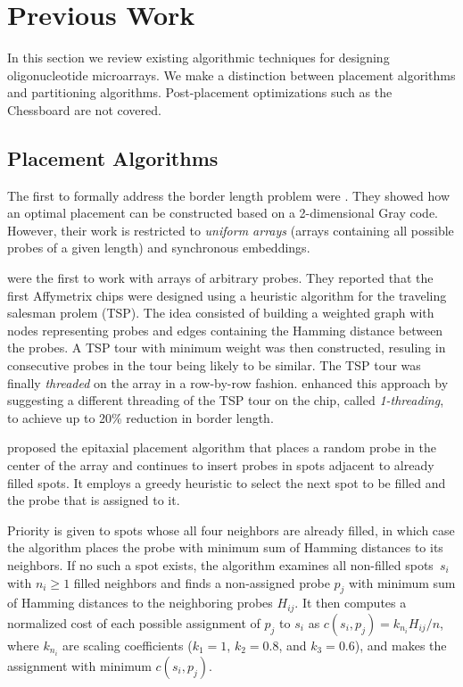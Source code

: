 \documentclass{bioinfo}
\begin{document}
\section{Previous Work}

In this section we review existing algorithmic techniques for designing oligonucleotide microarrays. We make a distinction between placement algorithms and partitioning algorithms. Post-placement optimizations such as the Chessboard \citep{KAHNG02} are not covered.

\subsection{Placement Algorithms}
\label{sec:placement_alg}

The first to formally address the border length problem were \citealp{FELDMAN93}. They showed how an optimal placement can be constructed based on a 2-dimensional Gray code. However, their work is restricted to \emph{uniform arrays} (arrays containing all possible probes of a given length) and synchronous embeddings.

\citealp{HANNENHALLI02} were the first to work with arrays of arbitrary probes. They reported that the first Affymetrix chips were designed using a heuristic algorithm for the traveling salesman prolem (TSP). The idea consisted of building a weighted graph with nodes representing probes and edges containing the Hamming distance between the probes. A TSP tour with minimum weight was then constructed, resuling in consecutive probes in the tour being likely to be similar. The TSP tour was finally \emph{threaded} on the array in a row-by-row fashion. \citealp{HANNENHALLI02} enhanced this approach by suggesting a different threading of the TSP tour on the chip, called \emph{1-threading}, to achieve up to 20\% reduction in border length.

\citealp{KAHNG02} proposed the epitaxial placement algorithm that places a random probe in the center of the array and continues to insert probes in spots adjacent to already filled spots. It employs a greedy heuristic to select the next spot to be filled and the probe that is assigned to it.

Priority is given to spots whose all four neighbors are already filled, in which case the algorithm places the probe with minimum sum of Hamming distances to its neighbors. If no such a spot exists, the algorithm examines all non-filled spots~$s_i$ with $n_i \geq 1$ filled neighbors and finds a non-assigned probe $p_j$ with minimum sum of Hamming distances to the neighboring probes $H_{ij}$. It then computes a normalized cost of each possible assignment of $p_j$ to $s_i$ as $c(s_i,p_j) = k_{n_i} H_{ij} / n$, where $k_{n_i}$ are scaling coefficients ($k_1 = 1$, $k_2 = 0.8$, and $k_3 = 0.6$), and makes the assignment with minimum $c(s_i,p_j)$.
\end{document}
